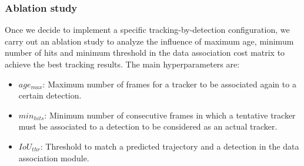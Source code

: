 
\subsubsection{Ablation study}
\label{subsubsec:4_mot_ablation}

Once we decide to implement a specific tracking-by-detection configuration, we carry out an ablation study to analyze the influence of maximum age, minimum number of hits and minimum threshold in the data association cost matrix to achieve the best tracking results. The main hyperparameters are:

\begin{itemize}
	
	\item \textbf{$age_{max}$}: Maximum number of frames for a tracker to be associated again to a certain detection.
	
	\item \textbf{$min_{hits}$}: Minimum number of consecutive frames in which a tentative tracker must be associated to a detection to be considered as an actual tracker.
	
	\item \textbf{$IoU_{thr}$}: Threshold to match a predicted trajectory and a detection in the data association module.
	
\end{itemize}

